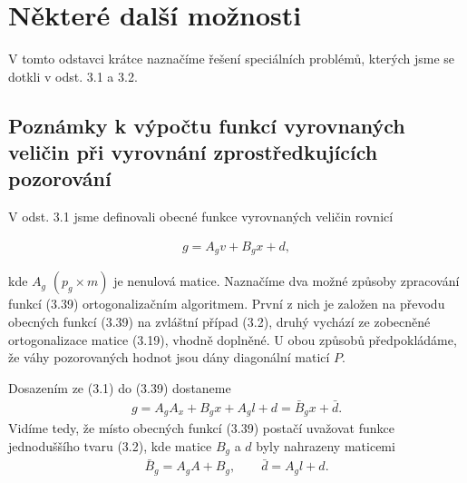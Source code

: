 \section{Některé další možnosti}


V tomto odstavci  krátce naznačíme řešení speciálních
problémů, kterých jsme se dotkli v odst. 3.1 a 3.2.

\subsection{Poznámky k výpočtu funkcí vyrovnaných veličin při
  vyrovnání zprostředkujících pozorování}

V odst. 3.1 jsme definovali obecné funkce vyrovnaných veličin rovnicí

\noindent
\begin{align*}
\tag{3.39}  g = A_gv + B_gx + d,
\end{align*}

\noindent
kde $A_g$ $(p_g \times m)$ je nenulová matice. Naznačíme dva možné
způsoby zpracování funkcí (3.39) ortogonalizačním algoritmem. První
z nich je založen na převodu obecných funkcí (3.39) na zvláštní
případ (3.2), druhý vychází ze zobecněné ortogonalizace matice
(3.19), vhodně doplněné. U obou způsobů předpokládáme, že váhy
pozorovaných hodnot jsou dány diagonální maticí $P$.


Dosazením ze (3.1) do (3.39) dostaneme
%
\begin{align*}\tag{3.40}
  g = A_gA_x + B_gx + A_gl + d = \bar{B}_gx + \bar{d}.
\end{align*}
%
Vidíme tedy, že místo obecných funkcí (3.39) postačí uvažovat funkce
jednoduššího tvaru (3.2), kde matice $B_g$ a $d$ byly nahrazeny
maticemi
%
\begin{align*}\tag{3.41}
  \bar{B}_g = A_gA + B_g, \qquad \bar{d} = A_gl + d.
\end{align*}
%


